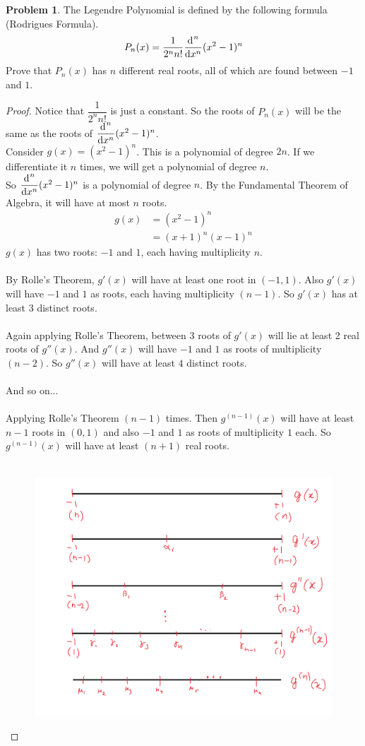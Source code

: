 \documentclass[14]{article}
\theoremstyle{definition}
\newtheorem{prob}{Problem}
\begin{document}
\begin{prob}
The Legendre Polynomial is defined by the following formula (Rodrigues Formula).
\[P_n(x) = \dfrac{1}{2^n n!} \dfrac{\dif^{\;n}}{\dif x^n} (x^2 - 1)^n\]
Prove that $P_n(x)$ has $n$ different real roots, all of which are found between $-1$ and $1$.
\begin{proof}
Notice that $\dfrac{1}{2^n n!}$ is just a constant. So the roots of $P_n(x)$ will be the same as the roots of $\dfrac{\dif^{\;n}}{\dif x^n} (x^2 - 1)^n$.\\
Consider $g(x) = (x^2 - 1)^n$. This is a polynomial of degree $2n$. If we differentiate it $n$ times, we will get a polynomial of degree $n$.\\
So $\dfrac{\dif^{\;n}}{\dif x^n} (x^2 - 1)^n$ is a polynomial of degree $n$.
By the Fundamental Theorem of Algebra, it will have at most $n$ roots.\\
\begin{align*}
g(x) &=  (x^2 - 1)^n\\
&= (x+1)^n(x-1)^n
\end{align*}
$g(x)$ has two roots: $-1$ and $1$, each having multiplicity $n$.\\\\
By Rolle's Theorem, $g'(x)$ will have at least one root in $(-1, 1)$. Also $g'(x)$ will have $-1$ and $1$ as roots, each having multiplicity $(n-1)$. So $g'(x)$ has at least $3$ distinct roots.\\\\
Again applying Rolle's Theorem, between 3 roots of $g'(x)$ will lie at least 2 real roots of $g''(x)$. And $g''(x)$ will have $-1$ and $1$ as roots of multiplicity $(n-2)$. So $g''(x)$ will have at least $4$ distinct roots.\\\\
And so on...\\\\
Applying Rolle's Theorem $(n-1)$ times. Then $g^{(n-1)}(x)$ will have at least $n-1$ roots in $(0, 1)$ and also $-1$ and $1$ as roots of multiplicity $1$ each. So $g^{(n-1)}(x)$ will have at least $(n + 1)$ real roots.\\\\
\begin{figure}[h]
\includegraphics[scale=0.35]{images/legendre}

\end{figure}
\end{proof}
\end{prob}
\end{document}
